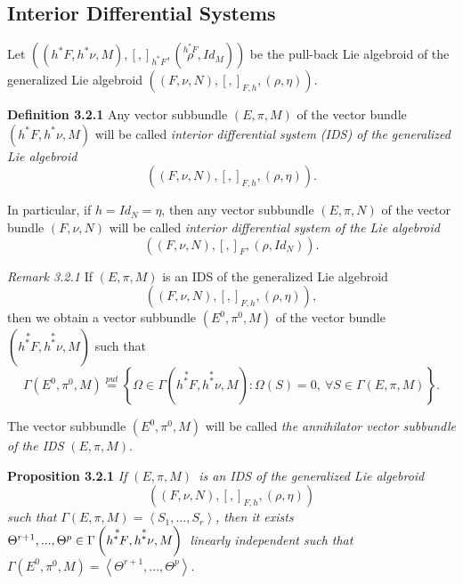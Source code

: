 \documentclass[11pt]{article}
\begin{document}
\subsection{Interior Differential Systems}

Let $\left( \left( h^{\ast }F,h^{\ast }\nu ,M\right) ,\left[ ,\right]
_{h^{\ast }F},\left( \overset{h^{\ast }F}{\rho },Id_{M}\right) \right) $ be
the pull-back Lie algebroid of the generalized Lie algebroid $\left( \left(
F,\nu ,N\right) ,\left[ ,\right] _{F,h},\left( \rho ,\eta \right) \right) $.

\textbf{Definition 3.2.1 }Any vector subbundle $\left( E,\pi ,M\right) $ of
the vector bundle $\left( h^{\ast }F,h^{\ast }\nu ,M\right) $ will be called
\emph{interior differential system (IDS) of the generalized Lie algebroid }%
\begin{equation*}
\left( \left( F,\nu ,N\right) ,\left[ ,\right] _{F,h},\left( \rho ,\eta
\right) \right) .
\end{equation*}

In particular, if $h=Id_{N}=\eta $, then any vector subbundle $\left( E,\pi
,N\right) $ of the vector bundle $\left( F,\nu ,N\right) $ will be called
\emph{interior differential system of the Lie algebroid }%
\begin{equation*}
\left( \left( F,\nu ,N\right) ,\left[ ,\right] _{F},\left( \rho
,Id_{N}\right) \right) .
\end{equation*}

\textit{Remark 3.2.1 }If $\left( E,\pi ,M\right) $ is an IDS of the
generalized Lie algebroid
\begin{equation*}
\left( \left( F,\nu ,N\right) ,\left[ ,\right] _{F,h},\left( \rho ,\eta
\right) \right) ,
\end{equation*}%
then we obtain a vector subbundle $\left( E^{0},\pi ^{0},M\right) $ of the
vector bundle $\left( \overset{\ast }{h^{\ast }F},\overset{\ast }{h^{\ast
}\nu },M\right) $ such that
\begin{equation*}
\Gamma \left( E^{0},\pi ^{0},M\right) \overset{put}{=}\left\{ \Omega \in
\Gamma \left( \overset{\ast }{h^{\ast }F},\overset{\ast }{h^{\ast }\nu }%
,M\right) :\Omega \left( S\right) =0,~\forall S\in \Gamma \left( E,\pi
,M\right) \right\} .
\end{equation*}

The vector subbundle $\left( E^{0},\pi ^{0},M\right) $ will be called \emph{%
the annihilator vector subbundle of the IDS }$\left( E,\pi ,M\right) .$

\textbf{Proposition 3.2.1 }\emph{If }$\left( E,\pi ,M\right) $\emph{\ is an
IDS of the generalized Lie algebroid }%
\begin{equation*}
\left( \left( F,\nu ,N\right) ,\left[ ,\right] _{F,h},\left( \rho ,\eta
\right) \right)
\end{equation*}%
\emph{such that }$\Gamma \left( E,\pi ,M\right) =\left\langle
S_{1},...,S_{r}\right\rangle $\emph{, then it exists }$\Theta
^{r+1},...,\Theta ^{p}\in \Gamma \left( \overset{\ast }{h^{\ast }F},\overset{%
\ast }{h^{\ast }\nu },M\right) $\emph{\ linearly independent such that }$%
\Gamma \left( E^{0},\pi ^{0},M\right) =\left\langle \Theta ^{r+1},...,\Theta
^{p}\right\rangle .$
\end{document}
